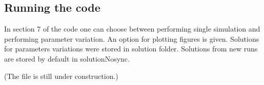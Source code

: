 \subsection{Running the code}
In section 7 of the code one can choose between performing single simulation and performing parameter variation.
An option for plotting figures is given. Solutions for parameters variations were stored in solution folder. Solutions from new runs are stored by default in solutionNosync. %


(The file is still under construction.)
